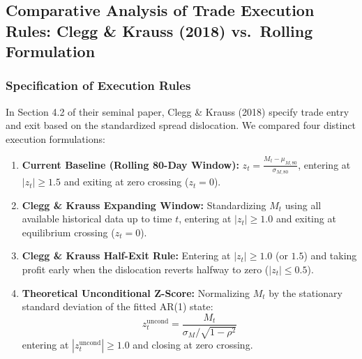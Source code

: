 \documentclass[11pt, a4paper]{article}
\begin{document}
\subsection{Comparative Analysis of Trade Execution Rules: Clegg \& Krauss (2018) vs.\ Rolling Formulation}
\label{sec:trade_rules}

\subsubsection{Specification of Execution Rules}
In Section 4.2 of their seminal paper, Clegg \& Krauss (2018) specify trade entry and exit based on the standardized spread dislocation. We compared four distinct execution formulations:
\begin{enumerate}
    \item \textbf{Current Baseline (Rolling 80-Day Window):} $z_t = \frac{M_t - \mu_{M, 80}}{\sigma_{M, 80}}$, entering at $|z_t| \ge 1.5$ and exiting at zero crossing ($z_t = 0$).
    \item \textbf{Clegg \& Krauss Expanding Window:} Standardizing $M_t$ using all available historical data up to time $t$, entering at $|z_t| \ge 1.0$ and exiting at equilibrium crossing ($z_t = 0$).
    \item \textbf{Clegg \& Krauss Half-Exit Rule:} Entering at $|z_t| \ge 1.0$ (or $1.5$) and taking profit early when the dislocation reverts halfway to zero ($|z_t| \le 0.5$).
    \item \textbf{Theoretical Unconditional Z-Score:} Normalizing $M_t$ by the stationary standard deviation of the fitted AR(1) state:
    \begin{equation}
        z_t^{\text{uncond}} = \frac{M_t}{\sigma_M / \sqrt{1 - \rho^2}}
    \end{equation}
    entering at $|z_t^{\text{uncond}}| \ge 1.0$ and closing at zero crossing.
\end{enumerate}
\end{document}
